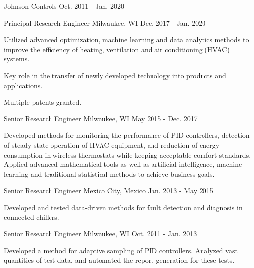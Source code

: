 

\begin{cventries}

\cvmultientry
{Johnson Controls} %
{}
{Oct. 2011 - Jan. 2020} %
{
\cvsubentry
{Principal Research Engineer} %
{Milwaukee, WI} %
{Dec. 2017 - Jan. 2020} %
{
\begin{cvitems} %
\item {Utilized advanced optimization, machine learning and data analytics methods to improve the efficiency of heating, ventilation and air conditioning (HVAC) systems.}
\item {Key role in the transfer of newly developed technology into products and applications.}
\item {Multiple patents granted.}
\end{cvitems}
}
\cvsubentry
{Senior Research Engineer} %
{Milwaukee, WI} %
{May 2015 - Dec. 2017} %
{
\begin{cvitems} %
\item {Developed methods for monitoring the performance of PID controllers, detection of steady state operation of HVAC equipment, and reduction of energy consumption in wireless thermostats while keeping acceptable comfort standards. Applied advanced mathematical tools  as well as artificial intelligence, machine learning and traditional statistical methods to achieve business goals.}
\end{cvitems}
}
\cvsubentry
{Senior Research Engineer} %
{Mexico City, Mexico} %
{Jan. 2013 - May 2015} %
{
\begin{cvitems} %
\item {Developed and tested data-driven methods for fault detection and diagnosis in connected chillers.}
\end{cvitems}
}
\cvsubentry
{Senior Research Engineer} %
{Milwaukee, WI} %
{Oct. 2011 - Jan. 2013} %
{
\begin{cvitems} %
\item {Developed a method for adaptive sampling of PID controllers. Analyzed vast quantities of test data, and automated the report generation for these tests.}
\end{cvitems}
}
}
\end{cventries}
